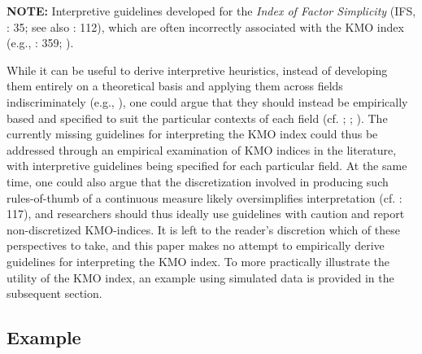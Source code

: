 \documentclass[
  10pt,
  a4paper,
  twoside]{article}
\begin{document}
\noindent
\fontsize{8pt}{10pt}\selectfont
\textbf{NOTE:} Interpretive guidelines developed for the \emph{Index of Factor Simplicity} (IFS, : 35; see also : 112), which are often incorrectly associated with the KMO index (e.g., : 359; ).
\endgroup
\vspace{1em}

While it can be useful to derive interpretive heuristics, instead of developing them entirely on a theoretical basis and applying them across fields indiscriminately (e.g., ), one could argue that they should instead be empirically based and specified to suit the particular contexts of each field (cf. ; ; ). The currently missing guidelines for interpreting the KMO index could thus be addressed through an empirical examination of KMO indices in the literature, with interpretive guidelines being specified for each particular field. At the same time, one could also argue that the discretization involved in producing such rules-of-thumb of a continuous measure likely oversimplifies interpretation (cf. : 117), and researchers should thus ideally use guidelines with caution and report non-discretized KMO-indices. It is left to the reader's discretion which of these perspectives to take, and this paper makes no attempt to empirically derive guidelines for interpreting the KMO index. To more practically illustrate the utility of the KMO index, an example using simulated data is provided in the subsequent section.

\subsection{Example}\label{sec:sec_kmo_example}
\end{document}
